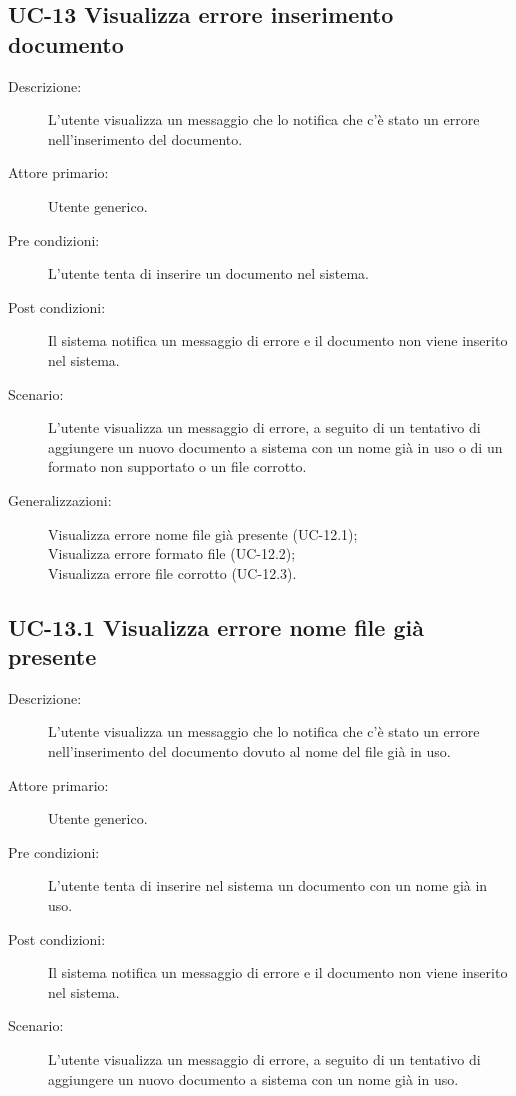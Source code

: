 \subsection{UC-13 Visualizza errore inserimento documento}
\begin{description}
    \item[Descrizione:] L'utente visualizza un messaggio che lo notifica che c'è stato un errore nell'inserimento del documento.
    \item[Attore primario:] Utente generico.
    \item[Pre condizioni:] L'utente tenta di inserire un documento nel sistema.
    \item[Post condizioni:] Il sistema notifica un messaggio di errore e il documento non viene inserito nel sistema.
    \item[Scenario:] L'utente visualizza un messaggio di errore, a seguito di un tentativo di aggiungere un nuovo documento a sistema con un nome già in uso o di un formato non supportato o un file corrotto.
    \item[Generalizzazioni:] Visualizza errore nome file già presente (UC-12.1);\\Visualizza errore formato file (UC-12.2);\\Visualizza errore file corrotto (UC-12.3).
\end{description}

\subsection{UC-13.1 Visualizza errore nome file già presente}
\begin{description}
    \item[Descrizione:] L'utente visualizza un messaggio che lo notifica che c'è stato un errore nell'inserimento del documento dovuto al nome del file già in uso.
    \item[Attore primario:] Utente generico.
    \item[Pre condizioni:] L'utente tenta di inserire nel sistema un documento con un nome già in uso.
    \item[Post condizioni:] Il sistema notifica un messaggio di errore e il documento non viene inserito nel sistema.
    \item[Scenario:] L'utente visualizza un messaggio di errore, a seguito di un tentativo di aggiungere un nuovo documento a sistema con un nome già in uso.
\end{description}

